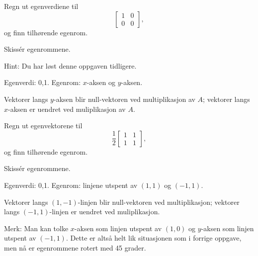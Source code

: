 \begin{oppgave}

\begin{punkt}
Regn ut egenverdiene til $$\begin{bmatrix}
1 & 0\\
0 & 0
\end{bmatrix},
$$ og finn tilhørende egenrom. 
\end{punkt}

\begin{punkt}
Skissér egenrommene.

\noindent 
Hint: Du har løst denne oppgaven tidligere.
\end{punkt}

\end{oppgave}

\begin{losning}

\begin{punkt}
Egenverdi: 0,1. Egenrom: $x$-aksen og $y$-aksen.
\end{punkt}

\begin{punkt}
Vektorer langs $y$-aksen blir null-vektoren ved multiplikasjon av $A$; vektorer langs $x$-aksen er uendret ved muliplikasjon av $A$.
\end{punkt}

\end{losning}


\begin{oppgave}
\begin{punkt}
Regn ut egenvektorene til $$\frac{1}{2}\begin{bmatrix}
1 & 1\\
1 & 1
\end{bmatrix},
$$ og finn tilhørende egenrom.

\end{punkt}

\begin{punkt}
Skissér egenrommene.
\end{punkt}

\end{oppgave}


\begin{losning}

\begin{punkt}
Egenverdi: 0,1. Egenrom: linjene utspent av $(1,1)$ og $(-1,1)$.
\end{punkt}

\begin{punkt}
Vektorer langs $(1,-1)$-linjen blir null-vektoren ved multiplikasjon; vektorer langs $(-1,1)$-linjen er uendret ved muliplikasjon.

\noindent
Merk: Man kan tolke $x$-aksen som linjen utspent av $(1,0)$ og $y$-aksen som linjen utspent av $(-1,1)$. Dette er altså helt lik situasjonen som i forrige oppgave, men nå er egenrommene rotert med 45 grader.
\end{punkt}

\end{losning}



